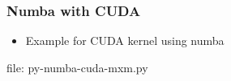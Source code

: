 
\begin{frame}[fragile]
\frametitle{Numba with CUDA}

\begin{itemize}
\item Example for CUDA kernel using numba
\end{itemize}

\newcommand{\newfilename}{py-numba-cuda-mxm.py}

file: \newfilename

\end{frame}

